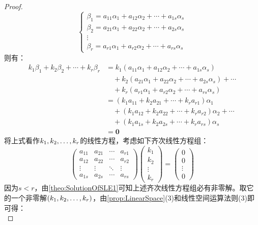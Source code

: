 \begin{proof}
\begin{equation*}
		\begin{cases}
			\beta_1=a_{11}\alpha_1+a_{12}\alpha_2+\cdots+a_{1s}\alpha_s \\
			\beta_2=a_{21}\alpha_1+a_{22}\alpha_2+\cdots+a_{2s}\alpha_s \\
			\vdots \\
			\beta_r=a_{r1}\alpha_1+a_{r2}\alpha_2+\cdots+a_{rs}\alpha_s
		\end{cases}
	\end{equation*}
	则有：
	\begin{align*}
		k_1\beta_1+k_2\beta_2+\cdots+k_r\beta_r
		&=k_1(a_{11}\alpha_1+a_{12}\alpha_2+\cdots+a_{1s}\alpha_s) \\
		&\quad+k_2(a_{21}\alpha_1+a_{22}\alpha_2+\cdots+a_{2s}\alpha_s)+\cdots \\
		&\quad+k_r(a_{r1}\alpha_1+a_{r2}\alpha_2+\cdots+a_{rs}\alpha_s) \\
		&=(k_1a_{11}+k_2a_{21}+\cdots+k_ra_{r1})\alpha_1 \\
		&\quad+(k_1a_{12}+k_2a_{22}+\cdots+k_ra_{r2})\alpha_2+\cdots \\
		&\quad+(k_1a_{1s}+k_2a_{2s}+\cdots+k_ra_{rs})\alpha_s \\
		&=\mathbf{0}
	\end{align*}
	将上式看作$k_1, k_2, \dots, k_{r}$的线性方程，考虑如下齐次线性方程组：
	\begin{equation*}
		\begin{pmatrix}
			a_{11} & a_{21} & \cdots & a_{r1} \\
			a_{12} & a_{22} & \cdots & a_{r2} \\
			\vdots & \vdots & \ddots & \vdots \\
			a_{1s} & a_{2s } & \cdots & a_{rs}
		\end{pmatrix}
		\begin{pmatrix}
			k_1 \\
			k_2 \\
			\vdots \\
			k_r
		\end{pmatrix}
		=
		\begin{pmatrix}
			0 \\
			0 \\
			\vdots \\
			0
		\end{pmatrix}
	\end{equation*}
	因为$s<r$，由\cref{theo:SolutionOfSLE1}可知上述齐次线性方程组必有非零解。取它的一个非零解$(k_1, k_2, \dots, k_{r})$，由\cref{prop:LinearSpace}(3)和线性空间运算法则(3)即可得：
	\begin{equation*}

\end{equation*}
\end{proof}
